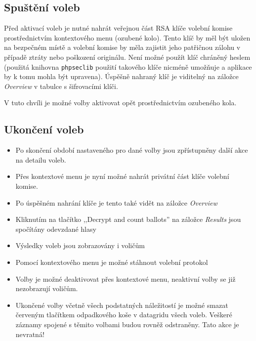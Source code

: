\subsection*{Spuštění voleb}
Před aktivací voleb je nutné nahrát veřejnou část RSA klíče volební komise prostřednictvím kontextového menu (ozubené kolo). Tento klíč by měl být uložen na bezpečném místě a volební komise by měla zajistit jeho patřičnou zálohu v případě ztráty nebo poškození originálu. Není možné použít klíč chráněný heslem (použitá knihovna \texttt{phpseclib} použití takového klíče nicméně umožňuje a aplikace by k tomu mohla být upravena). Úspěšně nahraný klíč je viditelný na záložce \textit{Overview} v tabulce s šifrovacími klíči.

V tuto chvíli je možné volby aktivovat opět prostřednictvím ozubeného kola.

\subsection*{Ukončení voleb}

\begin{itemize}
	\item Po skončení období nastaveného pro dané volby jsou zpřístupněny další akce na detailu voleb.
	\item Přes kontextové menu je nyní možné nahrát privátní část klíče volební komise.
	\item Po úspěšném nahrání klíče je tento také vidět na záložce \textit{Overview}
	\item Kliknutím na tlačítko ,,Decrypt and count ballots'' na záložce \textit{Results} jsou spočítány odevzdané hlasy
	\item Výsledky voleb jsou zobrazovány i voličům
	\item Pomocí kontextového menu je možné stáhnout volební protokol
	\item Volby je možné deaktivovat přes kontextové menu, neaktivní volby se již nezobrazují voličům.
	\item Ukončené volby včetně všech podstatných náležitostí je možné smazat červeným tlačítkem odpadkového koše v datagridu všech voleb. Veškeré záznamy spojené s těmito volbami budou rovněž odstraněny. Tato akce je nevratná!
\end{itemize}


